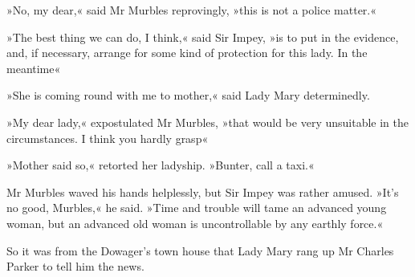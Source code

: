 »No, my dear,« said Mr Murbles reprovingly, »this is not a police matter.«

»The best thing we can do, I think,« said Sir Impey, »is to put in the evidence, and, if necessary, arrange for some kind of protection for this lady. In the meantime\longdash«

»She is coming round with me to mother,« said Lady Mary determinedly.

»My dear lady,« expostulated Mr Murbles, »that would be very unsuitable in the circumstances. I think you hardly grasp\longdash«

»Mother said so,« retorted her ladyship. »Bunter, call a taxi.«

Mr Murbles waved his hands helplessly, but Sir Impey was rather amused. »It's no good, Murbles,« he said. »Time and trouble will tame an advanced young woman, but an advanced old woman is uncontrollable by any earthly force.«

So it was from the Dowager's town house that Lady Mary rang up Mr Charles Parker to tell him the news.